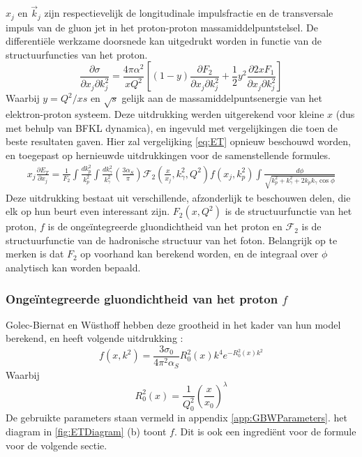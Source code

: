 \documentclass[a4paper,11pt]{article}
\numberwithin{equation}{section} %
\begin{document}
$x_j$  en $\vec{k}_j$ zijn respectievelijk de longitudinale impulsfractie en de transversale impuls van de gluon jet in het proton-proton massamiddelpuntstelsel.
De differentiële werkzame doorsnede kan uitgedrukt worden in functie van de structuurfuncties van het proton.
\begin{equation}
\frac{\partial \sigma}{\partial x_j \partial k_j^2} = \frac{4 \pi \alpha^2}{xQ^2} \left[ (1-y) \frac{\partial F_2}{\partial x_j \partial k_j^2} + \frac{1}{2} y^2 \frac{\partial 2xF_1}{\partial x_j \partial k_j^2} \right]
\end{equation}
Waarbij $y=Q^2/xs$ en $\sqrt{s}$ gelijk aan de massamiddelpuntsenergie van het elektron-proton systeem.
Deze uitdrukking werden uitgerekend voor kleine $x$ (dus met behulp van BFKL dynamica), en ingevuld met vergelijkingen die toen de beste resultaten gaven.
Hier zal vergelijking  \eqref{eq:ET} opnieuw beschouwd worden, en toegepast op hernieuwde uitdrukkingen voor de samenstellende formules.
\begin{align} \label{eq:ET}
x_j \frac{\partial E_T}{\partial x_j} = \frac{1}{F_2} \int \frac{dk_p^2}{k_p^2} \int \frac{dk_\gamma^2}{k_\gamma^2} \left( \frac{3\alpha_S}{\pi} \right) \mathcal{F}_2 \left( \frac{x}{x_j}, k_\gamma^2, Q^2 \right) f(x_j,k_p^2) \int \frac{d\phi}{\sqrt{k_p^2+k_\gamma^2 + 2k_p k_\gamma \cos{\phi}}}
\end{align}
Deze uitdrukking bestaat uit verschillende, afzonderlijk te beschouwen delen, die elk op hun beurt even interessant zijn.
$F_2 (x, Q^2)$ is de structuurfunctie van het proton, $f$ is de ongeïntegreerde gluondichtheid van het proton en $\mathcal{F}_2$ is de structuurfunctie van de hadronische structuur van het foton.
Belangrijk op te merken is dat $F_2$ op voorhand kan berekend worden, en de integraal over $\phi$ analytisch kan worden bepaald.
 
    \subsubsection{Ongeïntegreerde gluondichtheid van het proton $f$}
Golec-Biernat en Wüsthoff hebben deze grootheid in het kader van hun model berekend, en heeft volgende uitdrukking \cite[vgl. 9.255]{Barone}:
\begin{equation}
f(x,k^2) = \frac{3 \sigma_0}{4\pi^2 \alpha_S} R_0^2 (x) k^4 e^{-R_0^2(x) k^2}
\end{equation}
Waarbij
\begin{equation}
R_0^2(x) = \frac{1}{Q_0^2} \left( \frac{x}{x_0} \right)^\lambda
\end{equation}
De gebruikte parameters staan vermeld in appendix \ref{app:GBWParameters}.
het diagram in \ref{fig:ETDiagram} (b) toont $f$.
Dit is ook een ingrediënt voor de formule voor de volgende sectie.
\end{document}
